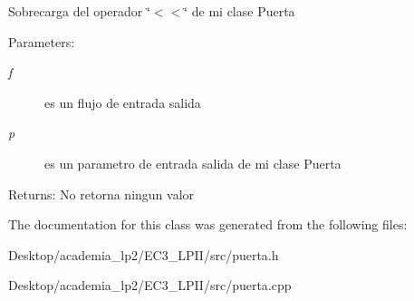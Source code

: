 Sobrecarga del operador \char`\"{}$<$$<$\char`\"{} de mi clase Puerta \begin{Desc}
\item[Parameters:]
\begin{description}
\item[{\em f}]es un flujo de entrada salida \item[{\em p}]es un parametro de entrada salida de mi clase Puerta \end{description}
\end{Desc}
\begin{Desc}
\item[Returns:]No retorna ningun valor \end{Desc}


The documentation for this class was generated from the following files:\begin{CompactItemize}
\item 
Desktop/academia\_\-lp2/EC3\_\-LPII/src/puerta.h\item 
Desktop/academia\_\-lp2/EC3\_\-LPII/src/puerta.cpp\end{CompactItemize}
